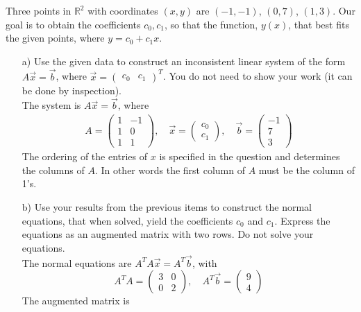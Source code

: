 \ifnum {}
    Three points in $\mathbb R^2$ with coordinates $(x,y)$ are $(-1,-1)$, $(0,7)$, $(1,3)$. Our goal is to obtain the coefficients $c_0, c_1$, so that the function, $y(x)$, that best fits the given points, where $y = c_0 + c_1x$. 
    \begin{enumerate}
    \item[a)] Use the given data to construct an inconsistent linear system of the form $A\vec x=\vec b$, where $\vec x = \begin{pmatrix} c_0 & c_1 \end{pmatrix}^T$. You do not need to show your work (it can be done by inspection). 
    \ifnum {} {\color{DarkBlue} \\[12pt] 
        The system is $A\vec x = \vec b$, where 
            \begin{align}
                A = \begin{pmatrix}1&-1\\1&0\\1&1 \end{pmatrix}, 
                \quad \vec x = \begin{pmatrix} c_0\\c_1 \end{pmatrix},
                \quad \vec b = \begin{pmatrix} -1\\7\\3\end{pmatrix}
            \end{align}
            The ordering of the entries of $x$ is specified in the question and determines the columns of $A$. In other words the first column of $A$ must be the column of 1's. 
        } 
        \else 
        \vfill
        \fi
    \item[b)] Use your results from the previous items to construct the normal equations, that when solved, yield the coefficients $c_0$ and $c_1$. Express the equations as an augmented matrix with two rows. Do not solve your equations. 
    \ifnum {} {\color{DarkBlue} \\[12pt] 
    The normal equations are $A^TA\vec x = A^T\vec b$, with
    $$A^TA = \begin{pmatrix} 3&0\\0&2\end{pmatrix}, \quad A^T\vec b = \begin{pmatrix}9\\4\end{pmatrix}$$
    The augmented matrix is
}
\end{enumerate}
